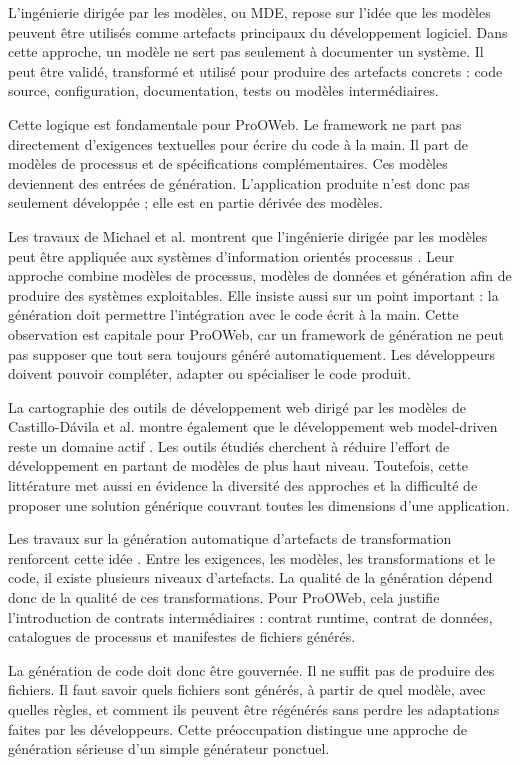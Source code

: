 \documentclass[12pt,a4paper]{article}
\begin{document}
L'ingénierie dirigée par les modèles, ou MDE, repose sur l'idée que les modèles peuvent être utilisés comme artefacts principaux du développement logiciel. Dans cette approche, un modèle ne sert pas seulement à documenter un système. Il peut être validé, transformé et utilisé pour produire des artefacts concrets : code source, configuration, documentation, tests ou modèles intermédiaires.

Cette logique est fondamentale pour ProOWeb. Le framework ne part pas directement d'exigences textuelles pour écrire du code à la main. Il part de modèles de processus et de spécifications complémentaires. Ces modèles deviennent des entrées de génération. L'application produite n'est donc pas seulement développée ; elle est en partie dérivée des modèles.

Les travaux de Michael et al. montrent que l'ingénierie dirigée par les modèles peut être appliquée aux systèmes d'information orientés processus \cite{michael2022}. Leur approche combine modèles de processus, modèles de données et génération afin de produire des systèmes exploitables. Elle insiste aussi sur un point important : la génération doit permettre l'intégration avec le code écrit à la main. Cette observation est capitale pour ProOWeb, car un framework de génération ne peut pas supposer que tout sera toujours généré automatiquement. Les développeurs doivent pouvoir compléter, adapter ou spécialiser le code produit.

La cartographie des outils de développement web dirigé par les modèles de Castillo-Dávila et al. montre également que le développement web model-driven reste un domaine actif \cite{castillo2024}. Les outils étudiés cherchent à réduire l'effort de développement en partant de modèles de plus haut niveau. Toutefois, cette littérature met aussi en évidence la diversité des approches et la difficulté de proposer une solution générique couvrant toutes les dimensions d'une application.

Les travaux sur la génération automatique d'artefacts de transformation renforcent cette idée \cite{frontiers2023}. Entre les exigences, les modèles, les transformations et le code, il existe plusieurs niveaux d'artefacts. La qualité de la génération dépend donc de la qualité de ces transformations. Pour ProOWeb, cela justifie l'introduction de contrats intermédiaires : contrat runtime, contrat de données, catalogues de processus et manifestes de fichiers générés.

La génération de code doit donc être gouvernée. Il ne suffit pas de produire des fichiers. Il faut savoir quels fichiers sont générés, à partir de quel modèle, avec quelles règles, et comment ils peuvent être régénérés sans perdre les adaptations faites par les développeurs. Cette préoccupation distingue une approche de génération sérieuse d'un simple générateur ponctuel.
\end{document}
